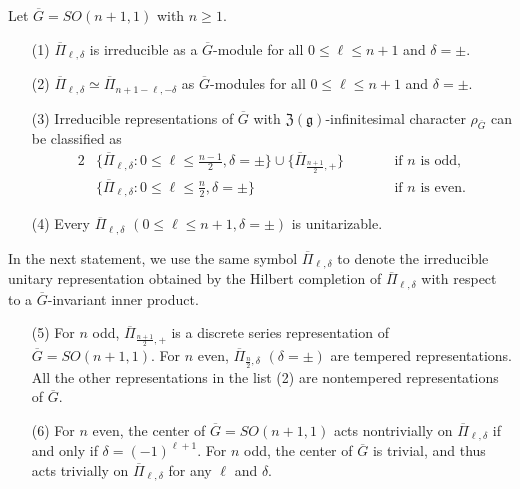 \begin{proposition}
\label{prop:161648}
Let ${\overline G}=SO(n+1,1)$
 with $n \ge 1$.  
\begin{enumerate}
\item[{\rm{(1)}}]
$\overline{\Pi}_{\ell,\delta}$ is irreducible as a $\overline G$-module
 for all $0 \le \ell \le n+1$ and $\delta = \pm $.  
\item[{\rm{(2)}}]
$\overline{\Pi}_{\ell,\delta} \simeq \overline{\Pi}_{n+1-\ell,-\delta}$
 as $\overline G$-modules
 for all $0 \le \ell \le n+1$ and $\delta = \pm $.  
\item[{\rm{(3)}}]
Irreducible representations of $\overline G$
 with ${\mathfrak {Z}}({\mathfrak {g}})$-infinitesimal character $\rho_{\overline G}$
 can be classified as 
\begin{alignat*}{2}
&
 \{ 
 \overline{\Pi}_{\ell,\delta}: 0 \le \ell \le \frac{n-1}{2}, \delta = \pm 
 \}
 \cup
 \{ 
 \overline{\Pi}_{\frac{n+1}{2},+}
 \}
 \qquad
&&
 \text{if $n$ is odd}, 
\\
&
 \{ 
 \overline{\Pi}_{\ell,\delta}: 0 \le \ell \le \frac{n}{2}, \delta = \pm 
 \}
 \qquad
&&
 \text{if $n$ is even}.  
\end{alignat*}
\item[{\rm{(4)}}]
Every $\overline{\Pi}_{\ell,\delta}$
 $(0 \le \ell \le n+1, \delta=\pm)$
 is unitarizable.  
\end{enumerate}
In the next statement,
 we use the same symbol $\overline{\Pi}_{\ell,\delta}$
 to denote the irreducible unitary representation 
obtained by the Hilbert completion 
of $\overline \Pi_{\ell,\delta}$ with respect to a $\overline G$-invariant inner product.  
\begin{enumerate}
\item[{\rm{(5)}}]
For $n$ odd, 
 $\overline{\Pi}_{\frac{n+1}{2},+}$ is a discrete series representation
 of $\overline G=SO(n+1,1)$.  
For $n$ even, 
 $\overline{\Pi}_{\frac{n}{2},\delta}$ $(\delta=\pm)$
 are 
tempered representations.  
All the other representations in the list (2)
 are nontempered representations of $\overline G$.  
\item[{\rm{(6)}}]
For $n$ even, 
 the center of $\overline G=SO(n+1,1)$ acts nontrivially
 on $\overline{\Pi}_{\ell,\delta}$
 if and only if $\delta=(-1)^{\ell+1}$.  
For $n$ odd, 
 the center of $\overline G$ is trivial, 
 and thus acts trivially
 on $\overline{\Pi}_{\ell,\delta}$
 for any $\ell$ and $\delta$.  
\end{enumerate}
\end{proposition}

